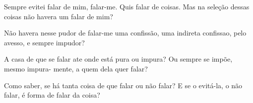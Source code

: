 \begin{poem}
\begin{stanza}
Sempre evitei falar de mim,\verseline
falar-me. Quis falar de coisas.\verseline
Mas na seleção dessas coisas\verseline
não havera um falar de mim?
\end{stanza}
\begin{stanza}
Não havera nesse pudor\verseline
de falar-me uma confissão,\verseline
uma indireta confissao,\verseline
pelo avesso, e sempre impudor?
\end{stanza}
\begin{stanza}
A casa de que se falar\verseline
ate onde está pura ou impura?\verseline
Ou sempre se impõe, mesmo impura-\verseline
mente, a quem dela quer falar?
\end{stanza}
\begin{stanza}
Como saber, se há tanta coisa\verseline
de que falar ou não falar?\verseline
E se o evitá-la, o não falar,\verseline
é forma de falar da coisa?
\end{stanza}
\end{poem}